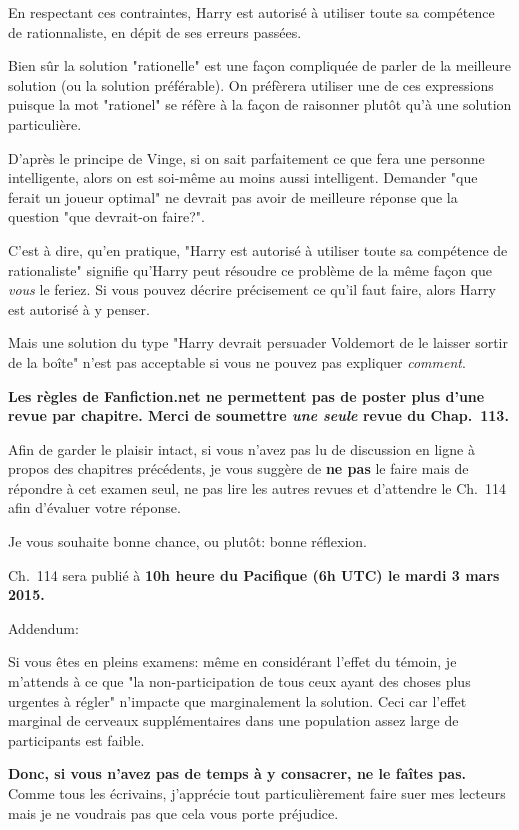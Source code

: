 {\setlength{\parindent}{0pt}
\setlength{\parskip}{.5\baselineskip}
En respectant ces contraintes, Harry est autorisé à utiliser toute sa compétence de rationnaliste, en dépit de ses erreurs passées.

Bien sûr la solution "rationelle" est une façon compliquée de parler de la meilleure solution (ou la solution préférable). On préfèrera utiliser une de ces expressions puisque la mot "rationel" se réfère à la façon de raisonner plutôt qu'à une solution particulière. 

D'après le principe de Vinge, si on sait parfaitement ce que fera une personne intelligente, alors on est soi-même au moins aussi intelligent. Demander "que ferait un joueur optimal" ne devrait pas avoir de meilleure réponse que la question "que devrait-on faire?".

C'est à dire, qu'en pratique, "Harry est autorisé à utiliser toute sa compétence de rationaliste" signifie qu'Harry peut résoudre ce problème de la même façon que \emph{vous} le feriez. Si vous pouvez décrire précisement ce qu'il faut faire, alors Harry est autorisé à y penser.

Mais une solution du type "Harry devrait persuader Voldemort de le laisser sortir de la boîte" n'est pas acceptable si vous ne pouvez pas expliquer \emph{comment}.

\textbf{Les règles de Fanfiction.net ne permettent pas de poster plus d'une revue par chapitre. Merci de soumettre \emph{une seule} revue du Chap.~113.}

Afin de garder le plaisir intact, si vous n'avez pas lu de discussion en ligne à propos des chapitres précédents, je vous suggère de \textbf{ne pas} le faire mais de répondre à cet examen seul, ne pas lire les autres revues et d'attendre le Ch.~114 afin d'évaluer votre réponse.

Je vous souhaite bonne chance, ou plutôt: bonne réflexion.

Ch.~114 sera publié à \textbf{10h heure du Pacifique (6h UTC) le mardi 3 mars 2015.}

Addendum:

Si vous êtes en pleins examens: même en considérant l'effet du témoin, je m'attends à ce que "la non-participation de tous ceux ayant des choses plus urgentes à régler" n'impacte que marginalement la solution. Ceci car l'effet marginal de cerveaux supplémentaires dans une population assez large de participants est faible.

\textbf{Donc, si vous n'avez pas de temps à y consacrer, ne le faîtes pas.} Comme tous les écrivains, j'apprécie tout particulièrement faire suer mes lecteurs mais je ne voudrais pas que cela vous porte préjudice.

}
